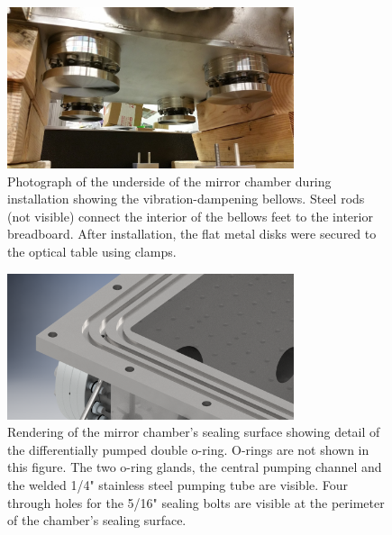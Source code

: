 \begin{figure}
	\centering
	\includegraphics[width=0.75\textwidth]{figures/chap2/mirror_chamber-bellows_feet_lowres.jpg}
	\caption{Photograph of the underside of the mirror chamber during installation showing the vibration-dampening bellows. Steel rods (not visible) connect the interior of the bellows feet to the interior breadboard. After installation, the flat metal disks were secured to the optical table using clamps.}
	\label{fig:mirror_chamber_bellows_feet}
\end{figure}

\begin{figure}
	\centering
	\includegraphics[width=0.75\textwidth]{figures/chap2/mirror_chamber-diff_pump_groove.png}
	\caption{Rendering of the mirror chamber's sealing surface showing detail of the differentially pumped double o-ring. O-rings are not shown in this figure. The two o-ring glands, the central pumping channel and the welded 1/4" stainless steel pumping tube are visible. Four through holes for the 5/16" sealing bolts are visible at the perimeter of the chamber's sealing surface.}
	\label{fig:mirror_chamber_diff_pump_groove}
\end{figure}

